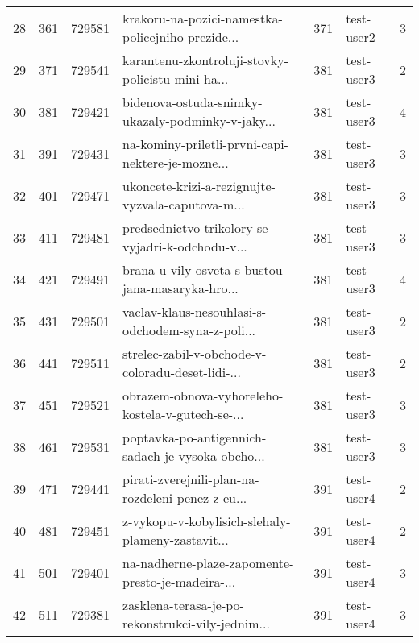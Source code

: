 \begin{tabular}{lrrlrlr}
28   &        361 &   729581 &  krakoru-na-pozici-namestka-policejniho-prezide... &      371 &                   test-user2 &               3 \\
29   &        371 &   729541 &  karantenu-zkontroluji-stovky-policistu-mini-ha... &      381 &                   test-user3 &               2 \\
30   &        381 &   729421 &  bidenova-ostuda-snimky-ukazaly-podminky-v-jaky... &      381 &                   test-user3 &               4 \\
31   &        391 &   729431 &  na-kominy-priletli-prvni-capi-nektere-je-mozne... &      381 &                   test-user3 &               3 \\
32   &        401 &   729471 &  ukoncete-krizi-a-rezignujte-vyzvala-caputova-m... &      381 &                   test-user3 &               3 \\
33   &        411 &   729481 &  predsednictvo-trikolory-se-vyjadri-k-odchodu-v... &      381 &                   test-user3 &               3 \\
34   &        421 &   729491 &  brana-u-vily-osveta-s-bustou-jana-masaryka-hro... &      381 &                   test-user3 &               4 \\
35   &        431 &   729501 &  vaclav-klaus-nesouhlasi-s-odchodem-syna-z-poli... &      381 &                   test-user3 &               2 \\
36   &        441 &   729511 &  strelec-zabil-v-obchode-v-coloradu-deset-lidi-... &      381 &                   test-user3 &               2 \\
37   &        451 &   729521 &  obrazem-obnova-vyhoreleho-kostela-v-gutech-se-... &      381 &                   test-user3 &               3 \\
38   &        461 &   729531 &  poptavka-po-antigennich-sadach-je-vysoka-obcho... &      381 &                   test-user3 &               3 \\
39   &        471 &   729441 &  pirati-zverejnili-plan-na-rozdeleni-penez-z-eu... &      391 &                   test-user4 &               2 \\
40   &        481 &   729451 &  z-vykopu-v-kobylisich-slehaly-plameny-zastavit... &      391 &                   test-user4 &               2 \\
41   &        501 &   729401 &  na-nadherne-plaze-zapomente-presto-je-madeira-... &      391 &                   test-user4 &               3 \\
42   &        511 &   729381 &  zasklena-terasa-je-po-rekonstrukci-vily-jednim... &      391 &                   test-user4 &               3 \\

\end{tabular}
